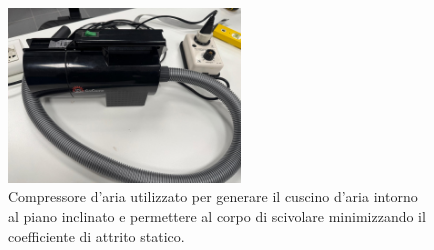 \documentclass[11pt]{article}
\begin{document}
\begin{figure}[H]
  \centering
  \hspace{0.5cm} %
  \label{fig:due_immagini}
\end{figure}

\begin{figure}[H]
  \centering
  \includegraphics[width=0.55\textwidth]{aria.jpg}
  \caption{Compressore d'aria utilizzato per generare il cuscino d'aria intorno al piano inclinato e permettere al corpo di scivolare minimizzando il coefficiente di attrito statico.}
\end{figure}
\end{document}
